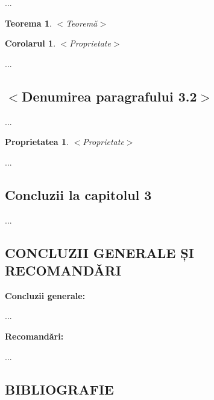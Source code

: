 \documentclass[a4paper, 12pt]{report}
\newtheorem{teo}[dfn]{Teorema}
\newtheorem{cor}[dfn]{Corolarul}
\newtheorem{pty}[dfn]{Proprietatea}
\begin{document}
...

\begin{teo}$<$Teoremă$>$
\end{teo}

\begin{cor}$<$Proprietate$>$
\end{cor}

...

\strut
\subsection{$<$Denumirea paragrafului 3.2$>$}

...

\begin{pty}$<$Proprietate$>$
\end{pty}

...

\subsection{Concluzii la capitolul 3}

...

\newpage

\begin{center}
\section*{CONCLUZII GENERALE ȘI RECOMANDĂRI}
\end{center}

{\bf Concluzii generale:}

...

{\bf Recomandări:}

...

\newpage

\begin{center}
\section*{BIBLIOGRAFIE}
\end{center}
\end{document}

